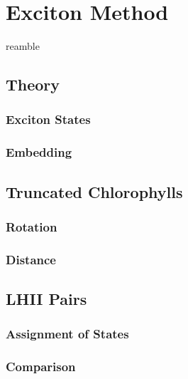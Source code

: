 %
%
\let\textcircled=\pgftextcircled
\chapter{Exciton Method}
\label{chap:excitons}

reamble

\section{Theory}
\label{sec:exciton_theory}

\subsection{Exciton States}
\label{subsec:exciton_states}

\subsection{Embedding}
\label{subsec:embedding}

\section{Truncated Chlorophylls}
\label{sec:trunc_chl}

\subsection{Rotation}
\label{subsec:rotation}

\subsection{Distance}
\label{subsec:distance}

\section{LHII Pairs}
\label{sec:LHII_excitons}

\subsection{Assignment of States}
\label{subsec:state_assign}

\subsection{Comparison}
\label{subsec:comparison}
